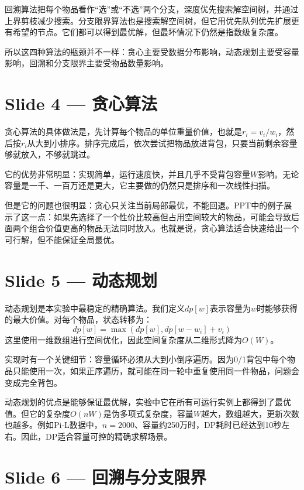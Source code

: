 \documentclass[12pt,a4paper]{ctexart}
\begin{document}
回溯算法把每个物品看作“选”或“不选”两个分支，深度优先搜索解空间树，并通过上界剪枝减少搜索。分支限界算法也是搜索解空间树，但它用优先队列优先扩展更有希望的节点。它们都可以得到最优解，但最坏情况下仍然是指数级复杂度。

所以这四种算法的瓶颈并不一样：贪心主要受数据分布影响，动态规划主要受容量影响，回溯和分支限界主要受物品数量影响。

\section*{Slide 4 — 贪心算法}

贪心算法的具体做法是，先计算每个物品的单位重量价值，也就是$r_i=v_i/w_i$，然后按$r_i$从大到小排序。排序完成后，依次尝试把物品放进背包，只要当前剩余容量够就放入，不够就跳过。

它的优势非常明显：实现简单，运行速度快，并且几乎不受背包容量$W$影响。无论容量是一千、一百万还是更大，它主要做的仍然只是排序和一次线性扫描。

但是它的问题也很明显：贪心只关注当前局部最优，不能回退。PPT中的例子展示了这一点：如果先选择了一个性价比较高但占用空间较大的物品，可能会导致后面两个组合价值更高的物品无法同时放入。也就是说，贪心算法适合快速给出一个可行解，但不能保证全局最优。

\section*{Slide 5 — 动态规划}

动态规划是本实验中最稳定的精确算法。我们定义$dp[w]$表示容量为$w$时能够获得的最大价值。对每个物品，状态转移为：
\[
dp[w]=\max(dp[w],dp[w-w_i]+v_i)
\]
这里使用一维数组进行空间优化，因此空间复杂度从二维形式降为$O(W)$。

实现时有一个关键细节：容量循环必须从大到小倒序遍历。因为0/1背包中每个物品只能使用一次，如果正序遍历，就可能在同一轮中重复使用同一件物品，问题会变成完全背包。

动态规划的优点是能够保证最优解，实验中它在所有可运行实例上都得到了最优值。但它的复杂度$O(nW)$是伪多项式复杂度，容量$W$越大，数组越大，更新次数也越多。例如Pi-L数据中，$n=2000$、容量约250万时，DP耗时已经达到10秒左右。因此，DP适合容量可控的精确求解场景。

\section*{Slide 6 — 回溯与分支限界}
\end{document}
